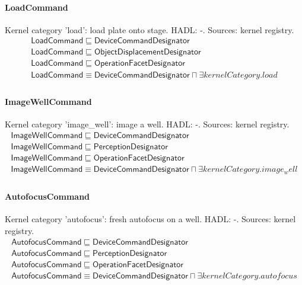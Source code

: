 \documentclass[10pt]{article}
\begin{document}
\paragraph{LoadCommand} Kernel category 'load': load plate onto stage. HADL: -. Sources: kernel registry.
\[\begin{array}{l}
\mathsf{LoadCommand} \sqsubseteq  \mathsf{DeviceCommandDesignator} \\
\mathsf{LoadCommand} \sqsubseteq  \mathsf{ObjectDisplacementDesignator} \\
\mathsf{LoadCommand} \sqsubseteq  \mathsf{OperationFacetDesignator} \\
\mathsf{LoadCommand} \equiv  \mathsf{DeviceCommandDesignator} \sqcap  \exists \mathit{kernelCategory}.{load} \\
\end{array}\]
\paragraph{ImageWellCommand} Kernel category 'image\_well': image a well. HADL: -. Sources: kernel registry.
\[\begin{array}{l}
\mathsf{ImageWellCommand} \sqsubseteq  \mathsf{DeviceCommandDesignator} \\
\mathsf{ImageWellCommand} \sqsubseteq  \mathsf{PerceptionDesignator} \\
\mathsf{ImageWellCommand} \sqsubseteq  \mathsf{OperationFacetDesignator} \\
\mathsf{ImageWellCommand} \equiv  \mathsf{DeviceCommandDesignator} \sqcap  \exists \mathit{kernelCategory}.{image_well} \\
\end{array}\]
\paragraph{AutofocusCommand} Kernel category 'autofocus': fresh autofocus on a well. HADL: -. Sources: kernel registry.
\[\begin{array}{l}
\mathsf{AutofocusCommand} \sqsubseteq  \mathsf{DeviceCommandDesignator} \\
\mathsf{AutofocusCommand} \sqsubseteq  \mathsf{PerceptionDesignator} \\
\mathsf{AutofocusCommand} \sqsubseteq  \mathsf{OperationFacetDesignator} \\
\mathsf{AutofocusCommand} \equiv  \mathsf{DeviceCommandDesignator} \sqcap  \exists \mathit{kernelCategory}.{autofocus} \\
\end{array}\]
\end{document}
